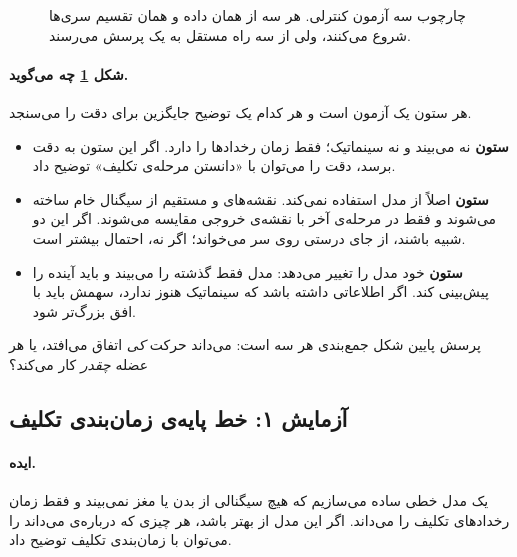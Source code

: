\begin{figure}[htbp]
\centering
\resizebox{\textwidth}{!}{}
\caption{چارچوب سه آزمون کنترلی. هر سه از همان داده و همان تقسیم سری‌ها شروع می‌کنند، ولی از سه راه مستقل به یک پرسش می‌رسند.}
\label{fig:ctrl-framework}
\end{figure}

\paragraph{شکل \ref{fig:ctrl-framework} چه می‌گوید.} هر ستون یک آزمون است و هر کدام یک توضیح جایگزین برای دقت  را می‌سنجد.
\begin{itemize}
\item \textbf{ستون } نه  می‌بیند و نه سینماتیک؛ فقط زمان رخدادها را دارد. اگر این ستون به دقت  برسد، دقت  را می‌توان با «دانستن مرحله‌ی تکلیف» توضیح داد.
\item \textbf{ستون } اصلاً از مدل استفاده نمی‌کند. نقشه‌های  و  مستقیم از سیگنال خام ساخته می‌شوند و فقط در مرحله‌ی آخر با نقشه‌ی  خروجی  مقایسه می‌شوند. اگر این دو شبیه باشند،  از جای درستی روی سر می‌خواند؛ اگر نه، احتمال  بیشتر است.
\item \textbf{ستون } خود مدل را تغییر می‌دهد: مدل فقط گذشته را می‌بیند و باید آینده را پیش‌بینی کند. اگر  اطلاعاتی داشته باشد که سینماتیک هنوز ندارد، سهمش باید با افق بزرگ‌تر شود.
\end{itemize}
پرسش پایین شکل جمع‌بندی هر سه است:  می‌داند حرکت \emph{کی} اتفاق می‌افتد، یا هر عضله \emph{چقدر} کار می‌کند؟

\subsection{آزمایش ۱: خط پایه‌ی زمان‌بندی تکلیف}
\label{sec:controls-phase}

\paragraph{ایده.} یک مدل خطی ساده می‌سازیم که هیچ سیگنالی از بدن یا مغز نمی‌بیند و فقط زمان رخدادهای تکلیف را می‌داند. اگر این مدل از  بهتر باشد، هر چیزی که  درباره‌ی  می‌داند را می‌توان با زمان‌بندی تکلیف توضیح داد.

